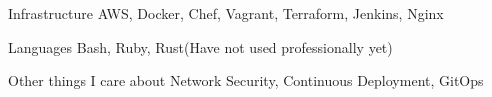 

\begin{cvskills}

  \cvskill
    {Infrastructure} %
    {AWS, Docker, Chef, Vagrant, Terraform, Jenkins, Nginx} %

  \cvskill
    {Languages} %
    {Bash, Ruby, Rust(Have not used professionally yet)} %

  \cvskill
    {Other things I care about} %
    {Network Security, Continuous Deployment, GitOps} %

\end{cvskills}
